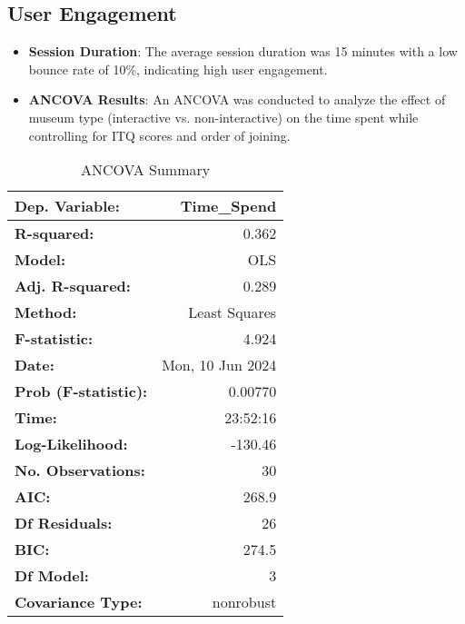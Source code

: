 \documentclass[conference]{IEEEtran}
\begin{document}
\subsection{User Engagement}
\begin{itemize}
    \item \textbf{Session Duration}: The average session duration was 15 minutes with a low bounce rate of 10\%, indicating high user engagement.
    \item \textbf{ANCOVA Results}: An ANCOVA was conducted to analyze the effect of museum type (interactive vs. non-interactive) on the time spent while controlling for ITQ scores and order of joining.
\end{itemize}

\begin{table}[h]
    \centering
    \begin{tabular}{|l|r|}
    \hline
    \textbf{Dep. Variable:} & Time\_Spend   \\ \hline
    \textbf{R-squared:} & 0.362 \\ \hline
    \textbf{Model:} & OLS \\ \hline
    \textbf{Adj. R-squared:} & 0.289 \\ \hline
    \textbf{Method:} & Least Squares \\ \hline
    \textbf{F-statistic:} & 4.924 \\ \hline
    \textbf{Date:} & Mon, 10 Jun 2024 \\ \hline
    \textbf{Prob (F-statistic):} & 0.00770 \\ \hline
    \textbf{Time:} & 23:52:16 \\ \hline
    \textbf{Log-Likelihood:} & -130.46 \\ \hline
    \textbf{No. Observations:} & 30 \\ \hline
    \textbf{AIC:} & 268.9 \\ \hline
    \textbf{Df Residuals:} & 26 \\ \hline
    \textbf{BIC:} & 274.5 \\ \hline
    \textbf{Df Model:} & 3 \\ \hline
    \textbf{Covariance Type:} & nonrobust \\ \hline
    \end{tabular}
    \caption{ANCOVA Summary}
\end{table}
\end{document}
